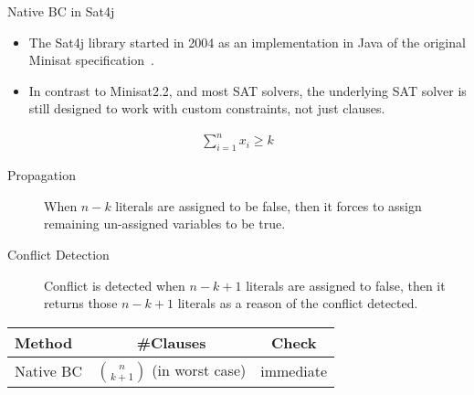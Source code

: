 \documentclass{beamer}
\begin{document}
\begin{frame}{Native BC in Sat4j~\cite{leberre10}}
  \begin{itemize}
  \item The \textsf{Sat4j} library started in 2004 as an
implementation in Java of the original \textsf{Minisat} 
specification~\cite{DBLP:conf/sat/EenS03}. 
\item In contrast to \textsf{Minisat2.2}, and most SAT solvers, the underlying SAT solver is still designed to work with custom constraints, not just clauses.
  \end{itemize}

  \begin{block}{}
\vspace{-1.5em}
\centering
\begin{align*}
\sum_{i=1}^{n}x_{i} \ge k
\end{align*}
\vspace{-1.3em}
\begin{description}
\item[Propagation] When $n-k$ literals are assigned to be false, then it forces to assign remaining un-assigned variables to be true.
\item[Conflict Detection] Conflict is detected when $n-k+1$ literals are assigned to false, then it returns those $n-k+1$ literals as a reason of the conflict detected. 
\end{description}
\begin{center}
\begin{tabular}{lcc}
\hline
Method & \#Clauses & Check \\\hline
Native BC & $\binom{n}{k+1}$ (in worst case) & immediate\\
\hline
\end{tabular}
\end{center}

  \end{block}
\end{frame}
\end{document}

